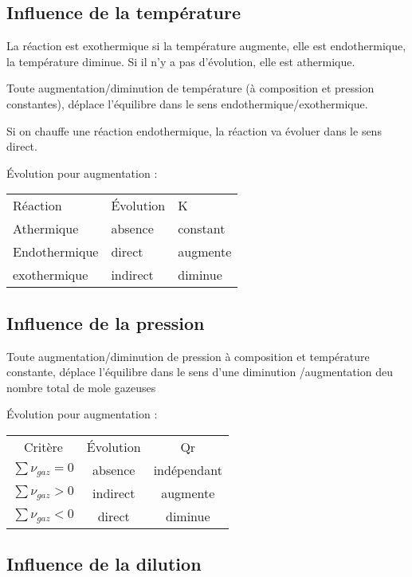 \documentclass[french]{yLectureNote}
\begin{document}
\subsection{Influence de la température}
La réaction est exothermique si la température augmente, elle est endothermique, la température diminue. Si il n'y a pas d'évolution, elle est athermique.
\begin{theorem}
 Toute augmentation/diminution de température (à composition et pression constantes), déplace l'équilibre dans le sens endothermique/exothermique.
\end{theorem}
Si on chauffe une réaction endothermique, la réaction va évoluer dans le sens direct.
\begin{center}
Évolution pour augmentation :
\begin{tabular}{lll}
Réaction & Évolution & K\\
Athermique & absence & constant\\
Endothermique & direct & augmente\\
exothermique & indirect & diminue
\end{tabular}
\end{center}

\subsection{Influence de la pression}
\begin{theorem}
 Toute augmentation/diminution de pression à composition et température constante, déplace l'équilibre dans le sens d'une diminution /augmentation deu nombre total de mole gazeuses
\end{theorem}

Évolution pour augmentation :
\begin{center}
\begin{tabular}{ccc}
Critère & Évolution & Qr\\
\(\sum \nu_{gaz} = 0\) & absence & indépendant\\
\(\sum \nu_{gaz} > 0\) & indirect & augmente\\
\(\sum \nu_{gaz} < 0\) & direct & diminue
\end{tabular}
\end{center}
\subsection{Influence de la dilution}
\end{document}
